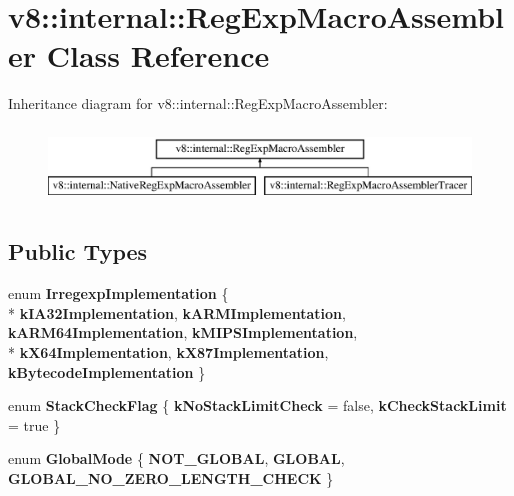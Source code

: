 \hypertarget{classv8_1_1internal_1_1_reg_exp_macro_assembler}{}\section{v8\+:\+:internal\+:\+:Reg\+Exp\+Macro\+Assembler Class Reference}
\label{classv8_1_1internal_1_1_reg_exp_macro_assembler}
Inheritance diagram for v8\+:\+:internal\+:\+:Reg\+Exp\+Macro\+Assembler\+:\begin{figure}[H]
\begin{center}
\leavevmode
\includegraphics[height=2.000000cm]{classv8_1_1internal_1_1_reg_exp_macro_assembler}
\end{center}
\end{figure}
\subsection*{Public Types}
\begin{DoxyCompactItemize}
\item 
\hypertarget{classv8_1_1internal_1_1_reg_exp_macro_assembler_aa25bfd5e513b3364931b82afd32f087d}{}enum {\bfseries Irregexp\+Implementation} \{ \\*
{\bfseries k\+I\+A32\+Implementation}, 
{\bfseries k\+A\+R\+M\+Implementation}, 
{\bfseries k\+A\+R\+M64\+Implementation}, 
{\bfseries k\+M\+I\+P\+S\+Implementation}, 
\\*
{\bfseries k\+X64\+Implementation}, 
{\bfseries k\+X87\+Implementation}, 
{\bfseries k\+Bytecode\+Implementation}
 \}\label{classv8_1_1internal_1_1_reg_exp_macro_assembler_aa25bfd5e513b3364931b82afd32f087d}

\item 
\hypertarget{classv8_1_1internal_1_1_reg_exp_macro_assembler_a91a9710d7239b05c338264daf2730f3b}{}enum {\bfseries Stack\+Check\+Flag} \{ {\bfseries k\+No\+Stack\+Limit\+Check} = false, 
{\bfseries k\+Check\+Stack\+Limit} = true
 \}\label{classv8_1_1internal_1_1_reg_exp_macro_assembler_a91a9710d7239b05c338264daf2730f3b}

\item 
\hypertarget{classv8_1_1internal_1_1_reg_exp_macro_assembler_a8c5dd9fba6bb0f236a08e824e5b83198}{}enum {\bfseries Global\+Mode} \{ {\bfseries N\+O\+T\+\_\+\+G\+L\+O\+B\+A\+L}, 
{\bfseries G\+L\+O\+B\+A\+L}, 
{\bfseries G\+L\+O\+B\+A\+L\+\_\+\+N\+O\+\_\+\+Z\+E\+R\+O\+\_\+\+L\+E\+N\+G\+T\+H\+\_\+\+C\+H\+E\+C\+K}
 \}\label{classv8_1_1internal_1_1_reg_exp_macro_assembler_a8c5dd9fba6bb0f236a08e824e5b83198}

\end{DoxyCompactItemize}
